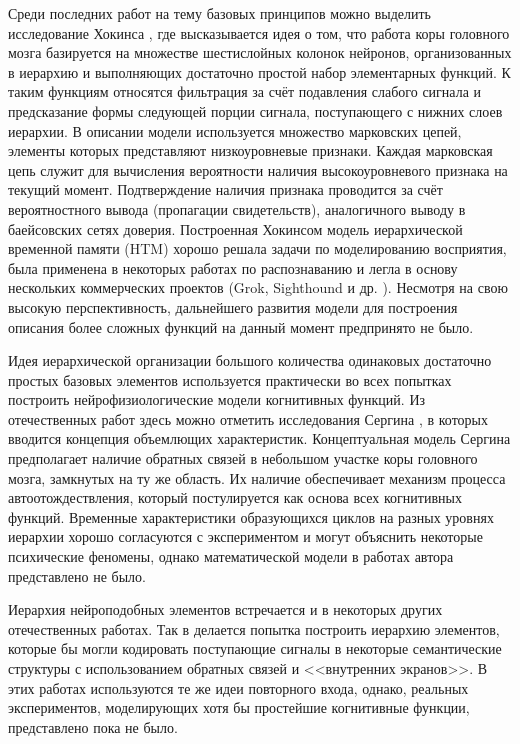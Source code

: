Среди последних работ на тему базовых принципов можно выделить исследование Хокинса \cite{Hawkins2009}, где высказывается идея о том, что работа коры головного мозга базируется на множестве шестислойных колонок нейронов, организованных в иерархию и выполняющих достаточно простой набор элементарных функций. К таким функциям относятся фильтрация за счёт подавления слабого сигнала и предсказание формы следующей порции сигнала, поступающего с нижних слоев иерархии. В описании модели используется множество марковских цепей, элементы которых представляют низкоуровневые признаки. Каждая марковская цепь служит для вычисления вероятности наличия высокоуровневого признака на текущий момент. Подтверждение наличия признака проводится за счёт вероятностного вывода (пропагации свидетельств), аналогичного выводу в баейсовских сетях доверия. Построенная Хокинсом модель иерархической временной памяти (HTM) хорошо решала задачи по моделированию восприятия, была применена в некоторых работах по распознаванию \cite{Bolotova2011} и легла в основу нескольких коммерческих проектов (Grok, Sighthound и др. \cite{NUM2014}). Несмотря на свою высокую перспективность, дальнейшего развития модели для построения описания более сложных функций на данный момент предпринято не было.

Идея иерархической организации большого количества одинаковых достаточно простых базовых элементов используется практически во всех попытках построить нейрофизиологические модели когнитивных функций. Из отечественных работ здесь можно отметить исследования Сергина \cite{Sergin2008,Sergin2009,Sergin2011}, в которых вводится концепция объемлющих характеристик. Концептуальная модель Сергина предполагает наличие обратных связей в небольшом участке коры головного мозга, замкнутых на ту же область. Их наличие обеспечивает механизм процесса автоотождествления, который постулируется как основа всех когнитивных функций. Временные характеристики образующихся циклов на разных уровнях иерархии хорошо согласуются с экспериментом и могут объяснить некоторые психические феномены, однако математической модели в работах автора представлено не было.

Иерархия нейроподобных элементов встречается и в некоторых других отечественных работах. Так в \cite{Vartanov2011,Chernavsky2012} делается попытка построить иерархию элементов, которые бы могли кодировать поступающие сигналы в некоторые семантические структуры с использованием обратных связей и <<внутренних экранов>>. В этих работах используются те же идеи повторного входа, однако, реальных экспериментов, моделирующих хотя бы простейшие когнитивные функции, представлено пока не было.

